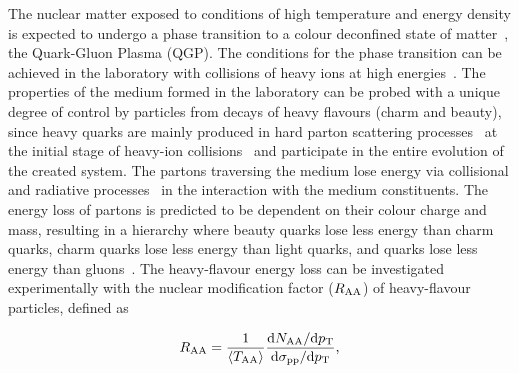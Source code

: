 \documentclass[11pt,a4paper]{article}
\begin{document}
The nuclear matter exposed to conditions of high temperature and energy density is expected to undergo a phase transition to a colour deconfined state of matter~\cite{Karsch:2001cy,pQCD5}, the Quark-Gluon Plasma (QGP). The conditions for the phase transition can be achieved in the laboratory with collisions of heavy ions at high energies~\cite{Karsch:2001cy}. 
The properties of the medium formed in the laboratory can be probed with a unique degree of control by particles from decays of heavy flavours (charm and beauty), since heavy quarks are mainly produced in hard parton scattering processes~\cite{Norrbin2000,Cacciari2012,Klasen:2014dba}  at the initial stage of heavy-ion collisions~\cite{PhysRevC.77.024901,0954-3899-34-8-S36} and participate in the entire evolution of the created system. The partons traversing the medium lose energy via collisional and radiative processes~\cite{Collc,Djordjevic:2006tw,Wicks:2007am,Baier:1996kr,PhysRevC.77.024905} in the interaction with the medium constituents.
The energy loss of partons  is predicted to be dependent on their colour charge and mass, resulting in a hierarchy where beauty quarks lose less energy than charm quarks, charm quarks lose less energy than light quarks, and quarks lose less energy than gluons~\cite{Wicks:2007am,Dokshitzer:2001zm,PhysRevD.69.114003}. 
The heavy-flavour energy loss can be investigated experimentally with the nuclear modification factor   ($R_{\rm AA}$) of heavy-flavour particles, defined as 

\begin{equation}
R_{\rm{AA}} = \frac{1}{\left\langle T_{\rm{AA}} \right\rangle} \frac{\mathrm{d}N_{\rm{AA}}/\mathrm{d}p_{\rm T}}{\mathrm{d}\sigma_{\rm{pp}}/\mathrm{d}p_{\rm T}}, 
\label{eq:raa}
\end{equation}
\end{document}

